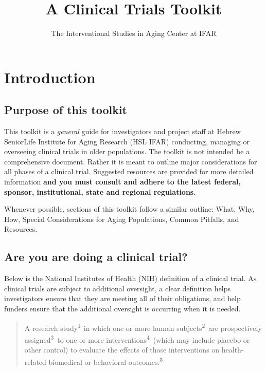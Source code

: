 \documentclass[]{book}
\title{A Clinical Trials Toolkit}
\author{The Interventional Studies in Aging Center at IFAR}
\date{}
\begin{document}
\maketitle

{
\setcounter{tocdepth}{1}
\tableofcontents
}
\clearpage 

\chapter{Introduction}\label{introduction}

\section{Purpose of this toolkit}\label{purpose-of-this-toolkit}

This toolkit is a \emph{general} guide for investigators and project
staff at Hebrew SeniorLife Institute for Aging Research (HSL IFAR)
conducting, managing or overseeing clinical trials in older populations.
The toolkit is not intended be a comprehensive document. Rather it is
meant to outline major considerations for all phases of a clinical
trial. Suggested resources are provided for more detailed information
\textbf{and you must consult and adhere to the latest federal, sponsor,
institutional, state and regional regulations.}

Whenever possible, sections of this toolkit follow a similar outline:
What, Why, How, Special Considerations for Aging Populations, Common
Pitfalls, and Resources.

\section{Are you are doing a clinical
trial?}\label{are-you-are-doing-a-clinical-trial}

Below is the National Institutes of Health (NIH) definition of a
clinical trial. As clinical trials are subject to additional oversight,
a clear definition helps investigators ensure that they are meeting all
of their obligations, and help funders ensure that the additional
oversight is occurring when it is needed.

\begin{quote}
A research study\textsuperscript{1~}in which one or more human
subjects\textsuperscript{2}~are prospectively
assigned\textsuperscript{3}~to one or more
interventions\textsuperscript{4}~(which may include placebo or other
control) to evaluate the effects of those interventions on
health-related biomedical or behavioral outcomes.\textsuperscript{5}
\end{quote}
\end{document}
